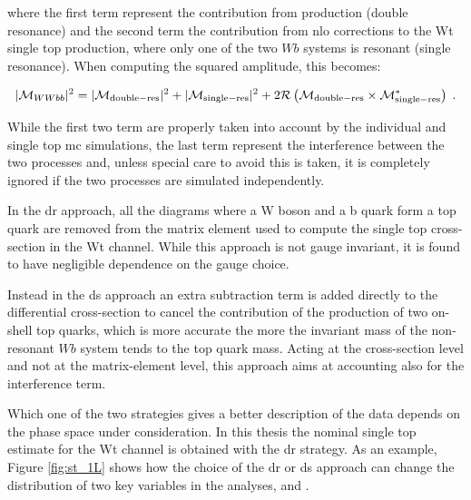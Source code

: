 \noindent where the first term represent the contribution from \ttbar production (double resonance) and the second term the contribution from 
\gls{nlo} corrections to the Wt single top production, where only one of the two $Wb$ systems is resonant (single resonance). 
When computing the squared amplitude, this becomes:

\begin{equation}
|\mathcal{M}_{WWbb}|^2 = |\mathcal{M}_{\rm{double-res}}|^2 + |\mathcal{M}_{\rm{single-res}}|^2 + 2 \mathcal{R}\left(\mathcal{M}_{\rm{double-res}}\times \mathcal{M}_{\rm{single-res}}^* \right) \; .
\end{equation}

While the first two term are properly taken into account by the individual \ttbar and single top \gls{mc} simulations, 
the last term represent the interference between the two processes and, unless special care to avoid this is taken, it is completely ignored if the two processes are simulated independently. 

In the \gls{dr} approach, all the diagrams where a W boson and a b quark form a top quark are removed from the matrix element used to compute the single top cross-section in the Wt channel. While this approach is not gauge invariant, it is found to have negligible dependence on the gauge choice.

Instead in the \gls{ds} approach an extra subtraction term is added directly to the differential cross-section to cancel the contribution of the 
production of two on-shell top quarks, which is more accurate the more the invariant mass of the non-resonant $Wb$ system tends to the top quark mass. 
Acting at the cross-section level and not at the matrix-element level, this approach aims at accounting also for the interference term. 

Which one of the two strategies gives a better description of the data depends on the phase space under consideration. 
In this thesis the nominal single top estimate for the Wt channel is obtained with the \gls{dr} strategy. 
As an example, Figure \ref{fig:st_1L} shows how the choice of the \gls{dr} or \gls{ds} approach can change the distribution of two key variables 
in the analyses, \met and \mtb. 

